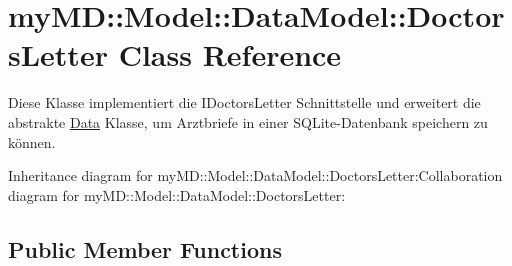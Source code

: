 \hypertarget{classmy_m_d_1_1_model_1_1_data_model_1_1_doctors_letter}{
\section{my\-MD::Model::Data\-Model::Doctors\-Letter Class Reference}
\label{dc/d86/classmy_m_d_1_1_model_1_1_data_model_1_1_doctors_letter}
}
Diese Klasse implementiert die IDoctors\-Letter Schnittstelle und erweitert die abstrakte \hyperlink{classmy_m_d_1_1_model_1_1_data_model_1_1_data}{Data} Klasse, um Arztbriefe in einer SQLite-Datenbank speichern zu k\"{o}nnen.  


Inheritance diagram for my\-MD::Model::Data\-Model::Doctors\-Letter:Collaboration diagram for my\-MD::Model::Data\-Model::Doctors\-Letter:\subsection*{Public Member Functions}
